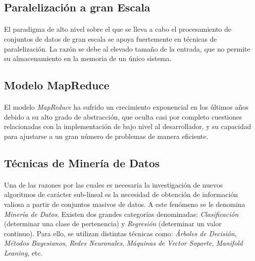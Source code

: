 \documentclass{subfiles}
\begin{document}
      \subsection{Paralelización a gran Escala}

        \paragraph{}
        El paradigma de alto nivel sobre el que se lleva a cabo el procesamiento de conjuntos de datos de gran escala se apoya fuertemente en técnicas de paralelización. La razón se debe al elevado tamaño de la entrada, que no permite su almacenamiento en la memoria de un único sistema.

        \subsection{Modelo MapReduce}

          \paragraph{}
          El modelo \emph{MapReduce} ha sufrido un crecimiento exponencial en los últimos años debido a su alto grado de abstracción, que oculta casi por completo cuestiones relacionadas con la implementación de bajo nivel al desarrollador, y su capacidad para ajustarse a un gran número de problemas de manera eficiente.

      \subsection{Técnicas de Minería de Datos}

        \paragraph{}
        Una de las razones por las cuales es necesaria la investigación de nuevos algoritmos de carácter sub-lineal es la necesidad de obtención de información valiosa a partir de conjuntos masivos de datos. A este fenómeno se le denomina \emph{Minería de Datos}. Existen dos grandes categorías denominadas: \emph{Clasificación} (determinar una clase de pertenencia) y \emph{Regresión} (determinar un valor continuo). Para ello, se utilizan distintas técnicas como: \emph{Árboles de Decisión}, \emph{Métodos Bayesianos}, \emph{Redes Neuronales}, \emph{Máquinas de Vector Soporte}, \emph{Manifold Leaning}, etc.
\end{document}

